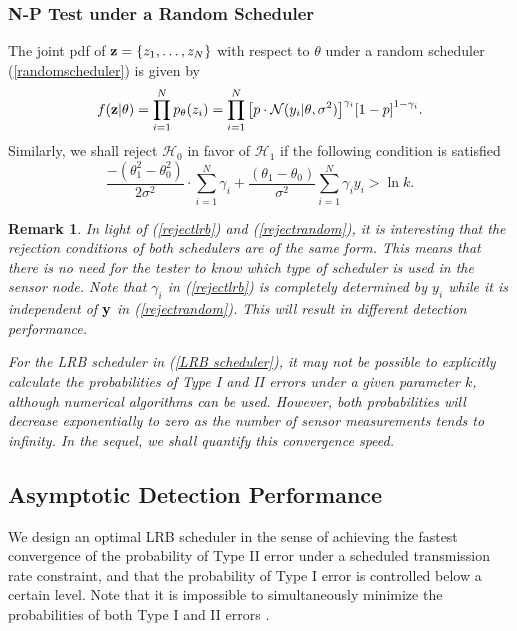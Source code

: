 \documentclass[journal]{IEEEtran}
\def\cH{\mathcal{H}}
\newtheorem{rem}{Remark}
\begin{document}
\subsubsection{N-P Test under a Random Scheduler}
The joint pdf of ${\bf{z}} = \{ {z_1}, \ldots, {z_N}\}$ with respect to $\theta$ under a random scheduler (\ref{randomscheduler}) is given by
\begin{eqnarray}
f({\bf{z}}| \theta ) = \prod\limits_{i = 1}^N {{p_\theta }({z_i})}  = \prod\limits_{i = 1}^N {{{\left[ {p \cdot {\cal N}(y_{i}|\theta ,\sigma^2 )} \right]}^{{\gamma _i}}}{{\left[ {1 - p} \right]}^{1 - {\gamma _i}}}}.
\end{eqnarray}
Similarly, we shall reject $\cH_{0}$ in favor of $\cH_1$ if the following condition is satisfied
\begin{equation}
\label{rejectrandom}
  \frac{{ - (\theta _1^2 - \theta _0^2)}}{{2{\sigma ^2}}} \cdot \sum\limits_{i = 1}^N {{\gamma_{i}}}  + \frac{{({\theta _1} - {\theta _0})}}{{{\sigma ^2}}}\sum\limits_{i = 1}^N {{\gamma_{i}y_i}}  >  \ln k.
\end{equation}
\begin{rem}
In light of (\ref{rejectlrb}) and (\ref{rejectrandom}), it is interesting that the rejection conditions of both schedulers are of the same form. This means that there is no need for the tester to know which type of scheduler is used in the sensor node. Note that $\gamma_i$ in (\ref{rejectlrb}) is completely determined by $y_i$ while it is independent of ${\bf y}$ in  (\ref{rejectrandom}). This will result in different detection performance.

For the LRB scheduler in  (\ref{LRB scheduler}),  it may not be possible to explicitly calculate the probabilities of Type I and II errors  under a given parameter $k$, although numerical algorithms can be used.  However, both probabilities will decrease exponentially to zero as the number of sensor measurements tends to infinity.  In the sequel, we shall quantify this convergence speed.
\end{rem}
\subsection{Asymptotic Detection Performance}
\label{sec_atp}
We  design an optimal LRB scheduler in the sense of achieving the fastest convergence of the probability of Type II error under a scheduled transmission rate constraint, and that the probability of Type I error is controlled below a certain level. Note that it is impossible to simultaneously minimize the probabilities of both Type I and II errors \cite{casella2001statistical}.
\end{document}
